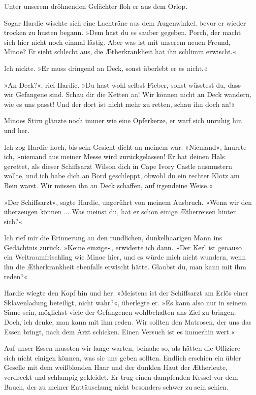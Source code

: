 \bigpar

Unter unserem dröhnenden Gelächter floh er aus dem Orlop.

\bigpar

Sogar Hardie wischte sich eine Lachträne aus dem Augenwinkel, bevor
er wieder trocken zu husten begann. »Dem hast du es sauber gegeben,
Porch, der macht sich hier nicht noch einmal lästig. Aber was ist
mit unserem neuen Freund, Minoe? Er sieht schlecht aus, die
Ætherkrankheit hat ihn schlimm erwischt.«

Ich nickte. »Er muss dringend an Deck, sonst überlebt er es
nicht.«

»An Deck?«, rief Hardie. »Du hast wohl selbst Fieber, sonst
wüsstest du, dass wir Gefangene sind. Schau dir die Ketten an! Wir
können nicht an Deck wandern, wie es uns passt! Und der dort ist
nicht mehr zu retten, schau ihn doch an!«

Minoes Stirn glänzte noch immer wie eine Opferkerze, er warf sich
unruhig hin und her.

Ich zog Hardie hoch, bis sein Gesicht dicht an meinem war.
»Niemand«, knurrte ich, »niemand aus meiner Messe wird
zurückgelassen! Er hat deinen Hals gerettet, als dieser Schiffsarzt
Wilson dich in Cape Ivory Castle ausmustern wollte, und ich habe
dich an Bord geschleppt, obwohl du ein rechter Klotz am Bein warst.
Wir müssen ihn an Deck schaffen, auf irgendeine Weise.«

»Der Schiffsarzt«, sagte Hardie, ungerührt von meinem Ausbruch.
»Wenn wir den überzeugen können ... Was meinst du, hat er schon
einige Ætherreisen hinter sich?«

Ich rief mir die Erinnerung an den rundlichen, dunkelhaarigen Mann
ins Gedächtnis zurück. »Keine einzige«, erwiderte ich dann. »Der
Kerl ist genauso ein Weltraumfrischling wie Minoe hier, und es
würde mich nicht wundern, wenn ihn die Ætherkrankheit ebenfalls
erwischt hätte. Glaubst du, man kann mit ihm reden?«

Hardie wiegte den Kopf hin und her. »Meistens ist der Schiffsarzt
am Erlös einer Sklavenladung beteiligt, nicht wahr?«, überlegte er.
»Es kann also nur in seinem Sinne sein, möglichst viele der
Gefangenen wohlbehalten ans Ziel zu bringen. Doch, ich denke, man
kann mit ihm reden. Wir sollten den Matrosen, der uns das Essen
bringt, nach dem Arzt schicken. Einen Versuch ist es immerhin
wert.«

\bigpar

Auf unser Essen mussten wir lange warten, beinahe so, als hätten
die Offiziere sich nicht einigen können, was sie uns geben sollten.
Endlich erschien ein übler Geselle mit dem weißblonden Haar und der
dunklen Haut der Ætherleute, verdreckt und schlampig gekleidet. Er
trug einen dampfenden Kessel vor dem Bauch, der zu meiner
Enttäuschung nicht besonders schwer zu sein schien.

